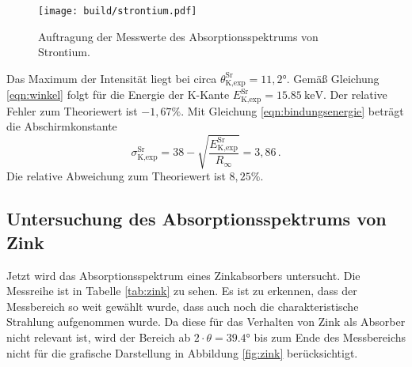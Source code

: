\begin{figure}
  \centering
  \texttt{[image: build/strontium.pdf]}
  \caption{Auftragung der Messwerte des Absorptionsspektrums von Strontium.}
  \label{fig:strontium}
\end{figure}

Das Maximum der Intensität liegt bei circa $\theta_{\text{K,exp}}^{\text{Sr}} = 11{,}2°$.
Gemäß Gleichung \eqref{eqn:winkel} folgt für die Energie der K-Kante $E_{\text{K,exp}}^{\text{Sr}} = \SI{15.85}{\kilo\electronvolt}$.
Der relative Fehler zum Theoriewert ist $-1{,}67\%$. Mit Gleichung \eqref{eqn:bindungsenergie}
beträgt die Abschirmkonstante
\begin{equation*}
  \sigma_{\text{K,exp}}^{\text{Sr}} =  38 - \sqrt{\frac{E_{\text{K,exp}}^{\text{Sr}}}{R_\infty}} = 3{,}86\,.
\end{equation*}
Die relative Abweichung zum Theoriewert ist $8{,}25\%$.

\subsection{Untersuchung des Absorptionsspektrums von Zink}
\label{subsec:zink}

Jetzt wird das Absorptionsspektrum eines Zinkabsorbers untersucht.
Die Messreihe ist in Tabelle \ref{tab:zink} zu sehen. Es ist zu erkennen, dass
der Messbereich so weit gewählt wurde, dass auch noch die charakteristische
Strahlung aufgenommen wurde. Da diese für das Verhalten von Zink als Absorber nicht
relevant ist, wird der Bereich ab $2 \cdot \theta = 39.4°$ bis zum Ende des Messbereichs
nicht für die grafische Darstellung in Abbildung \ref{fig:zink} berücksichtigt.

